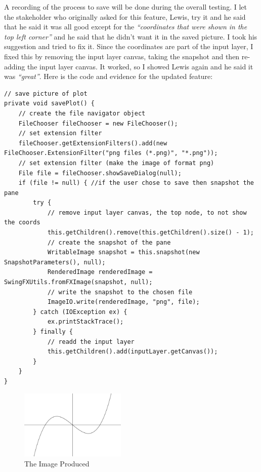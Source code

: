 \documentclass[../../../../main.tex]{subfiles}
\begin{document}
A recording of the process to save will be done during the overall testing.
\newpage\noindent
I let the stakeholder who originally asked for this feature, Lewis, try it and he said that he said it was all good except for the \textit{``coordinates that were shown in the top left corner''} and he said that he didn't want it in the saved picture. I took his suggestion and tried to fix it. Since the coordinates are part of the input layer, I fixed this by removing the input layer canvas, taking the snapshot and then re-adding the input layer canvas. It worked, so I showed Lewis again and he said it was \textit{``great''}. Here is the code and evidence for the updated feature:
\begin{verbatim}
// save picture of plot
private void savePlot() {
	// create the file navigator object
	FileChooser fileChooser = new FileChooser();
	// set extension filter
	fileChooser.getExtensionFilters().add(new FileChooser.ExtensionFilter("png files (*.png)", "*.png"));
	// set extension filter (make the image of format png)
	File file = fileChooser.showSaveDialog(null);
	if (file != null) {	//if the user chose to save then snapshot the pane
		try {
			// remove input layer canvas, the top node, to not show the coords
			this.getChildren().remove(this.getChildren().size() - 1);
			// create the snapshot of the pane
			WritableImage snapshot = this.snapshot(new SnapshotParameters(), null);
			RenderedImage renderedImage = SwingFXUtils.fromFXImage(snapshot, null);
			// write the snapshot to the chosen file
			ImageIO.write(renderedImage, "png", file);
		} catch (IOException ex) {
			ex.printStackTrace();
		} finally {
			// readd the input layer
			this.getChildren().add(inputLayer.getCanvas());
		}
	}
}
\end{verbatim}
\begin{figure}[H]
	\centering
	\includegraphics[width=0.45\textwidth]{images/withoutCoords}
	\caption{The Image Produced}
\end{figure}
\end{document}
